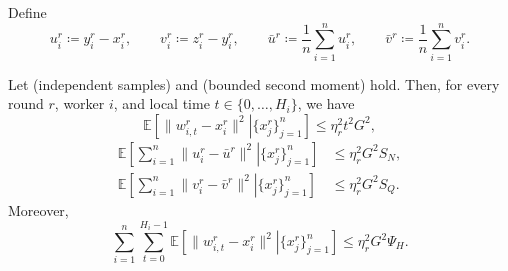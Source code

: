 \documentclass{article}
\newcommand{\eqdef}{\coloneqq}
\newcommand{\ExpCond}[2]{{\mathbb{E}}\left[\left.#1\right\vert#2\right]}
\theoremstyle{plain}
\theoremstyle{definition}
\begin{document}
Define
\begin{equation}\label{eq:4_defs}
u_i^r \eqdef y_i^r-x_i^r,
\qquad
v_i^r \eqdef z_i^r-y_i^r,
\qquad
\bar u^r \eqdef \frac{1}{n}\sum_{i=1}^n u_i^r,
\qquad
\bar v^r \eqdef \frac{1}{n}\sum_{i=1}^n v_i^r.
\end{equation}

\begin{lemma}\label{lem:within-round-drift}Let  (independent samples) and  (bounded second moment) hold. Then, for every round \(r\), worker \(i\), and local time \(t\in\{0,\dots,H_i\}\), we have
\begin{equation} \label{eq:W_bound_delay}
\ExpCond{ \|w_{i,t}^r-x_i^r\|^2 }{ \{x_j^r\}_{j=1}^n }
\leq
\eta_r^2 t^2 G^2,
\end{equation}
\begin{align}
\ExpCond{\sum_{i=1}^n \|u_i^r-\bar u^r\|^2 }{ \{x_j^r\}_{j=1}^n }
&\leq
\eta_r^2 G^2 S_N,
\label{eq:U_bound_delay}
\\
\ExpCond{\sum_{i=1}^n \|v_i^r-\bar v^r\|^2 }{ \{x_j^r\}_{j=1}^n }
&\leq
\eta_r^2 G^2 S_Q.
\label{eq:V_bound_delay}
\end{align}
Moreover,
\begin{equation}
\sum_{i=1}^n\sum_{t=0}^{H_i-1}
\ExpCond{\|w_{i,t}^r-x_i^r\|^2  }{ \{x_j^r\}_{j=1}^n }
\le
\eta_r^2 G^2 \Psi_H. \label{eq:double_W_bound_delay}
\end{equation}
\end{lemma}
\end{document}

